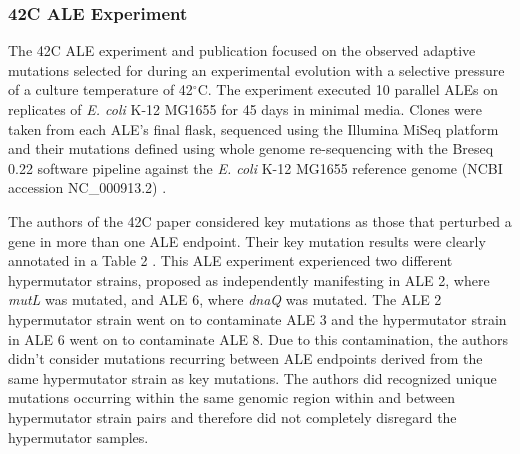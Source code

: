 \documentclass[12pt,final,masters,chapterheads]{ucsd}  %
\begin{document}
\subsubsection{42C ALE Experiment}
The 42C ALE experiment and publication focused on the observed adaptive mutations selected for during an experimental evolution with a selective pressure of a culture temperature of 42$^{\circ}$C. The experiment executed 10 parallel ALEs on replicates of \textit{E. coli} K-12 MG1655 for 45 days in minimal media. Clones were taken from each ALE's final flask, sequenced using the Illumina MiSeq platform and their mutations defined using whole genome re-sequencing with the Breseq 0.22 software pipeline against the \textit{E. coli} K-12 MG1655 reference genome (NCBI accession NC\_000913.2) \cite{pmid25015645}.

The authors of the 42C paper considered key mutations as those that perturbed a gene in more than one ALE endpoint. Their key mutation results were clearly annotated in a Table 2 \cite{pmid25015645}. This ALE experiment experienced two different hypermutator strains, proposed as independently manifesting in ALE 2, where \textit{mutL} was mutated, and ALE 6, where \textit{dnaQ} was mutated. The ALE 2 hypermutator strain went on to contaminate ALE 3 and the hypermutator strain in ALE 6 went on to contaminate ALE 8. Due to this contamination, the authors didn't consider mutations recurring between ALE endpoints derived from the same hypermutator strain as key mutations. The authors did recognized unique mutations occurring within the same genomic region within and between hypermutator strain pairs and therefore did not completely disregard the hypermutator samples.
\end{document}
